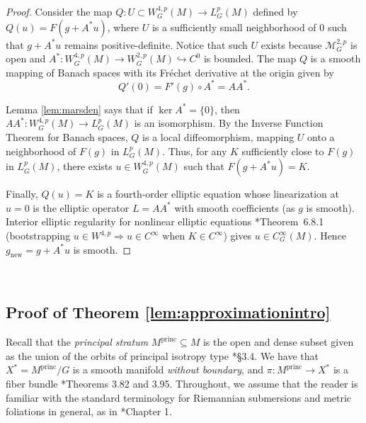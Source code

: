 \documentclass[12pt,a4paper]{amsart}
\theoremstyle{plain}
\theoremstyle{definition}
\theoremstyle{remark}
\newcommand{\ga}{\mathit{g}} %
\begin{document}
\begin{proof}
Consider the map $Q: U \subset W^{4,p}_G(M) \to L^p_G(M)$ defined by $Q(u) = F(\ga + A^*u)$, where $U$ is a sufficiently small neighborhood of $0$ such that $\ga + A^*u$ remains positive-definite. Notice that such $U$ exists because $\mathcal{M}_G^{2,p}$ is open and $A^*\colon W^{4,p}_G(M) \to W^{2,p}_G(M) \hookrightarrow C^0$ is bounded. The map $Q$ is a smooth mapping of Banach spaces with its Fr\'echet derivative at the origin given by 
\begin{equation}
    Q'(0) = F'(\ga) \circ A^* = AA^*.
\end{equation}

Lemma \ref{lem:marsden} says that if $\ker A^* = \{0\}$, then $AA^*: W^{4,p}_G(M) \to L^p_G(M)$ is an isomorphism. By the Inverse Function Theorem for Banach spaces, $Q$ is a local diffeomorphism, mapping $U$ onto a neighborhood of $F(\ga)$ in $L^p_G(M)$. Thus, for any $K$ sufficiently close to $F(\ga)$ in $L^p_G(M)$, there exists $u \in W^{4,p}_G(M)$ such that $F(\ga + A^*u) = K$. 

Finally, $Q(u)=K$ is a fourth-order elliptic equation whose linearization at $u=0$ is the
elliptic operator $L=AA^*$ with smooth coefficients (as $\ga$ is smooth). Interior elliptic
regularity for nonlinear elliptic equations \cite{Morrey1966}*{Theorem~6.8.1} (bootstrapping
$u\in W^{4,p}\Rightarrow u\in C^\infty$ when $K\in C^\infty$) gives $u\in C^\infty_G(M)$.
Hence $\ga_{\mathrm{new}} = \ga + A^*u$ is smooth.
\end{proof}

\ 

\subsection{Proof of Theorem \ref{lem:approximationintro}}
\label{sec:approx}

Recall that the \emph{principal stratum} $M^{\mathrm{princ}}\subseteq M$ is the open and dense subset given as the union of the orbits of principal isotropy type \cite{alexandrino2015lie}*{\S 3.4}. We have that $X^*=M^{\mathrm{princ}}/G$ is a smooth manifold \emph{without boundary}, and $\pi\colon M^{\mathrm{princ}}\to X^*$ is a fiber bundle \cite{alexandrino2015lie}*{Theorems 3.82 and 3.95}. Throughout, we assume that the reader is familiar with the standard terminology for Riemannian submersions and metric foliations in general, as in \cite{gw}*{Chapter 1}.
\end{document}
